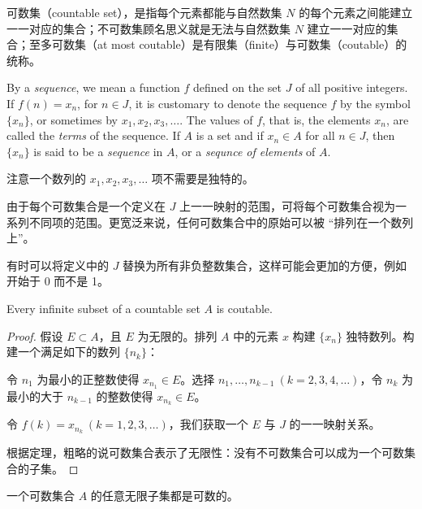 \documentclass[../poma-notes.tex]{subfiles}
\begin{document}
\anote
可数集（countable set），是指每个元素都能与自然数集 $N$ 的每个元素之间能建立一一对应的集合；不可数集顾名思义就是无法与自然数集
$N$ 建立一一对应的集合；至多可数集（at most coutable）是有限集（finite）与可数集（coutable）的统称。

\setcounter{poma}{6}

\begin{definition}
  By a \textit{sequence}, we mean a function $f$ defined on the set $J$ of all positive integers. If $f(n)=x_n$,
  for $n \in J$, it is customary to denote the sequence $f$ by the symbol $\{x_n\}$, or sometimes by $x_1,x_2,x_3,\dots$.
  The values of $f$, that is, the elements $x_n$, are called the \textit{terms} of the sequence. If $A$ is a set and
  if $x_n \in A$ for all $n \in J$, then $\{x_n\}$ is said to be a \textit{sequence} in $A$, or a \textit{sequnce of elements}
  of $A$.
\end{definition}

注意一个数列的 $x_1,x_2,x_3,\dots$ 项不需要是独特的。

由于每个可数集合是一个定义在 $J$ 上一一映射的范围，可将每个可数集合视为一系列不同项的范围。更宽泛来说，任何可数集合中的原始可以被
“排列在一个数列上”。

有时可以将定义中的 $J$ 替换为所有非负整数集合，这样可能会更加的方便，例如开始于 0 而不是 1。

\begin{theorem}
  Every infinite subset of a countable set $A$ is coutable.
\end{theorem}

\begin{proof}
  假设 $E \subset A$，且 $E$ 为无限的。排列 $A$ 中的元素 $x$ 构建 $\{x_n\}$ 独特数列。构建一个满足如下的数列 $\{n_k\}$：

  令 $n_1$ 为最小的正整数使得 $x_{n_1} \in E$。选择 $n_1,\dots,n_{k-1} \ (k=2,3,4,\dots)$，令 $n_k$ 为最小的大于 $n_{k-1}$
  的整数使得 $x_{n_k} \in E$。

  令 $f(k)=x_{n_k} \ (k=1,2,3,\dots)$，我们获取一个 $E$ 与 $J$ 的一一映射关系。

  根据定理，粗略的说可数集合表示了无限性：没有不可数集合可以成为一个可数集合的子集。
\end{proof}

\anote
一个可数集合 $A$ 的任意无限子集都是可数的。
\end{document}
